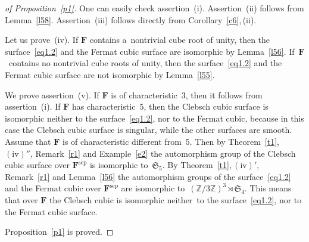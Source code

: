 \documentclass{amsart}
\numberwithin{equation}{section}
\theoremstyle{plain}
\theoremstyle{definition}
\theoremstyle{remark}
\begin{document}
\begin{proof}[of Proposition~\ref{p1}]
One can easily check assertion~(i). Assertion~(ii) follows from Lemma~\ref{l58}. Assertion~(iii) follows directly from Corollary~\ref{c6},\,(ii).

Let us prove~(iv). If $\mathbf{F}$ contains a~nontrivial cube root of unity, then the surface~\eqref{eq1.2} and the Fermat cubic surface are isomorphic by Lemma~\ref{l56}. If~$\mathbf{F}$~contains no nontrivial cube roots of unity, then the surface~\eqref{eq1.2} and the Fermat cubic surface are not isomorphic by Lemma~\ref{l55}.

We prove assertion~(v). If $\mathbf{F}$ is of characteristic~$3$, then it
follows from assertion~(i). If $\mathbf{F}$ has characteristic~$5$, then the
Clebsch cubic surface is isomorphic neither to the surface~\eqref{eq1.2}, nor
to the Fermat cubic, because in this case the \mbox{Clebsch} cubic surface is
singular, while the other surfaces are smooth. Assume that $\mathbf{F}$ is of
characteristic different from~$5$. Then by
Theorem~\ref{t1},\,$(\mathrm{iv})''$, Remark~\ref{r1} and Example~\ref{e2}
the automorphism group of the Clebsch cubic surface over
$\mathbf{F}^{\mathrm{sep}}$ is isomorphic to~$\mathfrak{S}_5$. By
Theorem~\ref{t1},\,$(\mathrm{iv})'$, Remark~\ref{r1} and Lemma~\ref{l56} the
automorphism groups of the surface~\eqref{eq1.2} and the Fermat cubic over
$\mathbf{F}^{\mathrm{sep}}$ are isomorphic to~$(\mathbb{Z}/3\mathbb{Z})^3
\rtimes \mathfrak{S}_4$. This means that over $\mathbf{F}$ the Clebsch cubic
is isomorphic neither~to the surface~\eqref{eq1.2}, nor to the Fermat cubic
surface.

Proposition~\ref{p1} is proved.
\end{proof}
\end{document}
